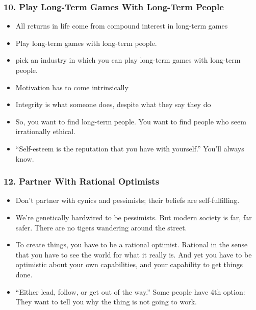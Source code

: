 \begin{frame}[fragile]
\frametitle{10. Play Long-Term Games With Long-Term People}
\begin{itemize}
\item All returns in life come from compound interest in long-term games
\item Play long-term games with long-term people.
\item pick an industry in which you can play long-term games with long-term people.
\item Motivation has to come intrinsically
\item Integrity is what someone does, despite what they say they do
\item So, you want to find long-term people. You want to find people who seem irrationally ethical.
\item ``Self-esteem is the reputation that you have with yourself.'' You'll always know.
\end{itemize}
\end{frame}

\begin{frame}[fragile]
\frametitle{12. Partner With Rational Optimists}
\begin{itemize}
\item Don't partner with cynics and pessimists; their beliefs are self-fulfilling.
\item We're genetically hardwired to be pessimists. But modern society is far, far safer. There are no tigers wandering around the street.
\item To create things, you have to be a rational optimist. Rational in the sense that you have to see the world for what it really is. And yet you have to be optimistic about your own capabilities, and your capability to get things done.
\item``Either lead, follow, or get out of the way.'' Some people have 4th option: They want to tell you why the thing is not going to work.
\end{itemize}
\end{frame}



